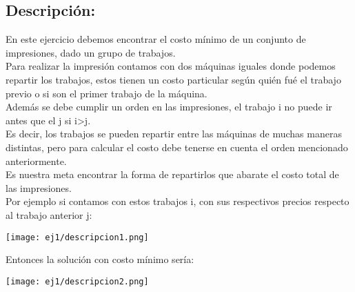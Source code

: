 \subsection{Descripción:}

En este ejercicio debemos encontrar el costo mínimo de un conjunto de impresiones, dado un grupo de trabajos.\\

Para realizar la impresión contamos con dos máquinas iguales donde podemos repartir los trabajos, estos tienen un costo particular según quién fué el trabajo previo o si son el primer trabajo de la máquina.\\
Además se debe cumplir un orden en las impresiones, el trabajo i no puede ir antes que el j si i>j.\\
Es decir, los trabajos se pueden repartir entre las máquinas de muchas maneras distintas, pero para calcular el costo debe tenerse en cuenta el orden mencionado anteriormente.\\

Es nuestra meta encontrar la forma de repartirlos que abarate el costo total de las impresiones.\\

Por ejemplo si contamos con estos trabajos i, con sus respectivos precios respecto al trabajo anterior j:\\
\begin{center}
\texttt{[image: ej1/descripcion1.png]} \\
\end{center}

Entonces la solución con costo mínimo sería:\\
\begin{center}
\texttt{[image: ej1/descripcion2.png]}\\
\end{center}



